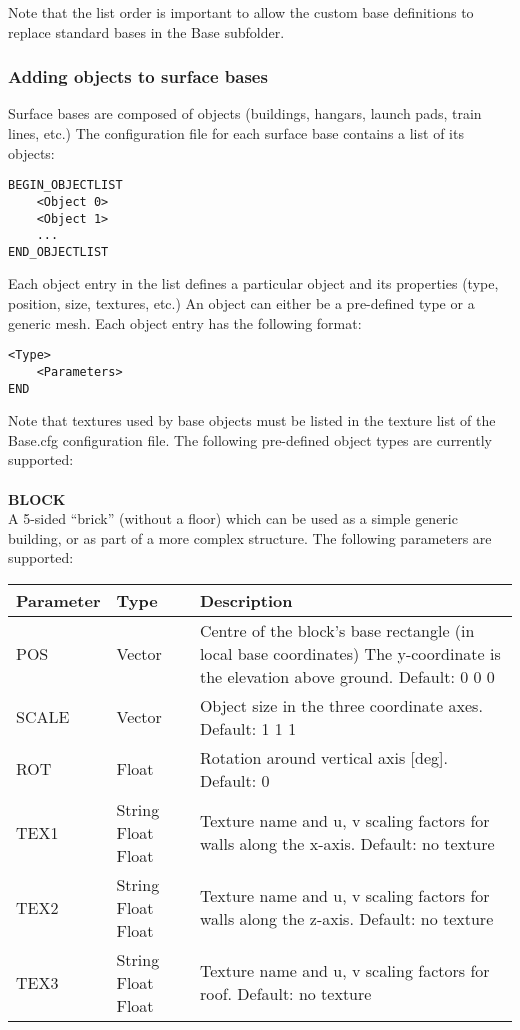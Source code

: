 \documentclass[Orbiter Developer Manual.tex]{subfiles}
\begin{document}
\noindent
Note that the list order is important to allow the custom base definitions to replace standard bases in the Base subfolder.


\subsubsection*{Adding objects to surface bases}
Surface bases are composed of objects (buildings, hangars, launch pads, train lines, etc.) The configuration file for each surface base contains a list of its objects:

\begin{lstlisting}[language=OSFS]
BEGIN_OBJECTLIST
	<Object 0>
	<Object 1>
	...
END_OBJECTLIST
\end{lstlisting}

\noindent
Each object entry in the list defines a particular object and its properties (type, position, size, textures, etc.) An object can either be a pre-defined type or a generic mesh. Each object entry has the following format:

\begin{lstlisting}[language=OSFS]
<Type>
	<Parameters>
END
\end{lstlisting}

\noindent
Note that textures used by base objects must be listed in the texture list of the Base.cfg configuration file.
The following pre-defined object types are currently supported:\\
\\
\textbf{BLOCK}\\
A 5-sided “brick” (without a floor) which can be used as a simple generic building, or as part of a more complex structure. The following parameters are supported:

	\begin{longtable}{ |p{}|p{}|p{}| }
	\hline\rule{0pt}{2ex}
	\textbf{Parameter} & \textbf{Type} & \textbf{Description}\\
	\hline\rule{0pt}{2ex}
	POS & Vector & Centre of the block’s base rectangle (in local base coordinates) The y-coordinate is the elevation above ground. Default: 0 0 0\\
	\hline\rule{0pt}{2ex}
	SCALE & Vector & Object size in the three coordinate axes. Default: 1 1 1\\
	\hline\rule{0pt}{2ex}
	ROT & Float & Rotation around vertical axis [deg]. Default: 0\\
	\hline\rule{0pt}{2ex}
	TEX1 & String Float Float & Texture name and u, v scaling factors for walls along the x-axis. Default: no texture\\
	\hline\rule{0pt}{2ex}
	TEX2 & String Float Float & Texture name and u, v scaling factors for walls along the z-axis. Default: no texture\\
	\hline\rule{0pt}{2ex}
	TEX3 & String Float Float & Texture name and u, v scaling factors for roof. Default: no texture\\
	\hline
	\end{longtable}
\end{document}
